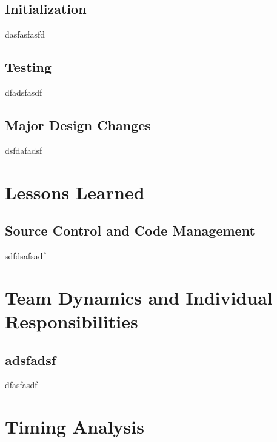 \documentclass[12pt]{report}
\begin{document}
\section{Initialization}

dasfasfasfd

\section{Testing}

dfadsfasdf

\section{Major Design Changes}

dsfdafadsf

\chapter{Lessons Learned}

\section{Source Control and Code Management}

sdfdsafsadf

\chapter{Team Dynamics and Individual Responsibilities}

\section{adsfadsf}

dfasfasdf

\chapter{Timing Analysis}
\end{document}
